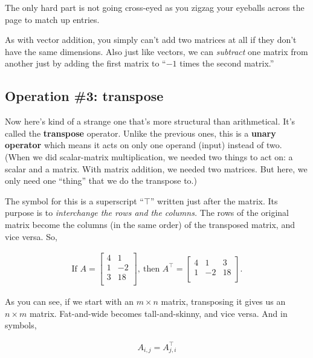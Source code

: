 The only hard part is not going cross-eyed as you zigzag your eyeballs across
the page to match up entries.

As with vector addition, you simply can't add two matrices at all if they don't
have the same dimensions. Also just like vectors, we can \textit{subtract} one
matrix from another just by adding the first matrix to ``$-1$ times the second
matrix.''

\subsection*{Operation \#3: transpose}


Now here's kind of a strange one that's more structural than arithmetical. It's
called the \textbf{transpose} operator. Unlike the previous ones, this is a
\textbf{unary operator} which means it acts on only one operand (input) instead
of two. (When we did scalar-matrix multiplication, we needed two things to act
on: a scalar and a matrix. With matrix addition, we needed two matrices. But
here, we only need one ``thing'' that we do the transpose to.)

The symbol for this is a superscript ``$\intercal$'' written just after the
matrix. Its purpose is to \textit{interchange the rows and the columns.} The
rows of the original matrix become the columns (in the same order) of the
transposed matrix, and vice versa. So,

\vspace{-.15in}
\begin{align*}
\textrm{If } A = 
\begin{bmatrix}
4 & 1 \\
1 & -2 \\
3 & 18 \\
\end{bmatrix},
\ \textrm{then } A^\intercal = 
\begin{bmatrix}
4 & 1 & 3 \\
1 & -2 & 18 \\
\end{bmatrix}.
\end{align*}

As you can see, if we start with an $m\times n$ matrix, transposing it gives us
an $n\times m$ matrix. Fat-and-wide becomes tall-and-skinny, and vice versa.
And in symbols,

\vspace{-.25in}
\begin{align*}
A_{i,j} = A^\intercal_{j,i}
\end{align*}
\vspace{-.25in}

